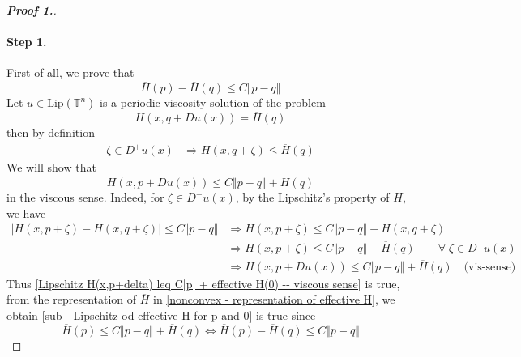 \documentclass[12pt, oneside]{amsart}  	%
\begin{document}
\begin{proof}[\textbf{Proof 1.}]
\paragraph{\textbf{Step 1.}} First of all, we prove that 
\begin{equation}\label{sub - Lipschitz od effective H for p and 0}
\overline{H}(p) - \overline{H}(q) \leq C\Vert p - q\Vert
\end{equation}
Let $u\in \text{Lip}(\mathbb{T}^n)$ is a periodic viscosity solution of the problem
\begin{equation}\label{Lipschitz E_q}
H(x,q + Du(x)) = \overline{H}(q)\tag{$E_q$}
\end{equation}
then by definition
\begin{align*}
\zeta\in D^+u(x) &\Longrightarrow H(x,q+\zeta) \leq  \overline{H}(q)
\end{align*}
We will show that
\begin{equation}\label{Lipschitz H(x,p+delta) leq C|p| + effective H(0) -- viscous sense}
H(x,p+Du(x)) \leq C\Vert p-q\Vert + \overline{H}(q)
\end{equation}
in the viscous sense. Indeed, for $\zeta\in D^+u(x)$, by the Lipschitz's property of $H$, we have
\begin{align*}
|H(x,p+\zeta) - H(x,q+\zeta)| \leq C\Vert p-q\Vert &\Longrightarrow 
H(x,p+\zeta)\leq C\Vert p-q\Vert + H(x,q+\zeta)   \\
 &\Longrightarrow H(x,p+\zeta)\leq  C\Vert p-q\Vert + \overline{H}(q) \quad\quad \forall\; \zeta\in D^+u(x)\\
 &\Longrightarrow  H(x,p+Du(x)) \leq C\Vert p-q\Vert + \overline{H}(q) \quad\text{(vis-sense)}
\end{align*}
Thus \eqref{Lipschitz H(x,p+delta) leq C|p| + effective H(0) -- viscous sense} is true, from the representation of $\overline{H}$ in \eqref{nonconvex - representation of effective H}, we obtain \eqref{sub - Lipschitz od effective H for p and 0} is true since
\begin{equation*}
\overline{H}(p) \leq C\Vert p-q\Vert + \overline{H}(q) \Longleftrightarrow \overline{H}(p) - \overline{H}(q) \leq C\Vert p-q\Vert
\end{equation*}
\vspace*{0.2cm}


\end{proof}
\end{document}
